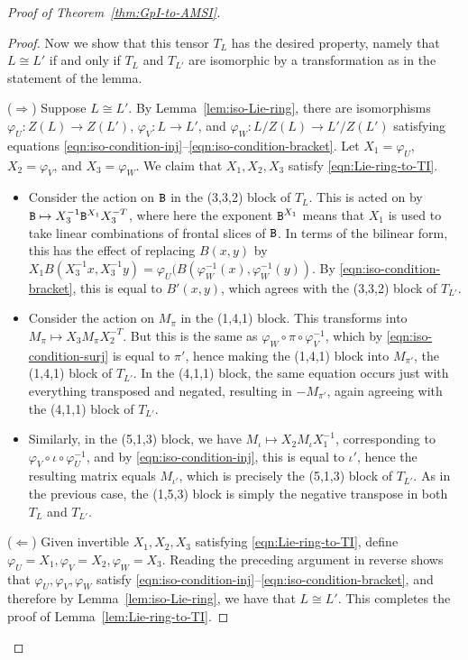 \begin{proof}[Proof of Theorem~\ref{thm:GpI-to-AMSI}]
\begin{proof}
Now we show that this tensor $T_L$ has the desired property, namely that $L \cong L'$ if and only if $T_L$ and $T_{L'}$ are isomorphic by a transformation as in the statement of the lemma.

($\Rightarrow$) Suppose $L \cong L'$. By Lemma~\ref{lem:iso-Lie-ring}, there are isomorphisms $\varphi_U \colon Z(L) \to Z(L')$, $\varphi_V \colon L \to L'$, and $\varphi_W \colon L/Z(L) \to L' / Z(L')$ satisfying equations \eqref{eqn:iso-condition-inj}--\eqref{eqn:iso-condition-bracket}. Let $X_1 = \varphi_U$, $X_2 = \varphi_V$, and $X_3 = \varphi_W$. We claim that $X_1, X_2, X_3$ satisfy \eqref{eqn:Lie-ring-to-TI}.
\begin{itemize}
\item Consider the action on $\mathtt{B}$ in the (3,3,2) block of $T_L$. This is acted on by $\mathtt{B} \mapsto X_3^{-1} \mathtt{B}^{X_1} X_3^{-T}$, where here the exponent $\mathtt{B}^{X_1}$ means that $X_1$ is used to take linear combinations of frontal slices of $\mathtt{B}$. In terms of the bilinear form, this has the effect of replacing $B(x,y)$ by $X_1 B(X_3^{-1} x, X_3^{-1} y) = \varphi_U(B(\varphi_W^{-1}(x), \varphi_W^{-1}(y))$. By \eqref{eqn:iso-condition-bracket}, this is equal to $B'(x,y)$, which agrees with the (3,3,2) block of $T_{L'}$.

\item Consider the action on $M_{\pi}$ in the (1,4,1) block.  This transforms into $M_\pi \mapsto X_3 M_\pi X_2^{-T}$. But this is the same as $\varphi_W \circ \pi \circ \varphi_V^{-1}$, which by \eqref{eqn:iso-condition-surj} is equal to $\pi'$, hence making the (1,4,1) block into $M_{\pi'}$, the (1,4,1) block of $T_{L'}$. In the (4,1,1) block, the same equation occurs just with everything transposed and negated, resulting in $-M_{\pi'}$, again agreeing with the (4,1,1) block of $T_{L'}$.

\item Similarly, in the (5,1,3) block, we have $M_{\iota} \mapsto X_2 M_{\iota} X_1^{-1}$, corresponding to $\varphi_V \circ \iota \circ \varphi_U^{-1}$, and by \eqref{eqn:iso-condition-inj}, this is equal to $\iota'$, hence the resulting matrix equals $M_{\iota'}$, which is precisely the (5,1,3) block of $T_{L'}$. As in the previous case, the (1,5,3) block is simply the negative transpose in both $T_L$ and $T_{L'}$.
\end{itemize}

($\Leftarrow$) Given invertible $X_1, X_2, X_3$ satisfying \eqref{eqn:Lie-ring-to-TI}, define $\varphi_U = X_1, \varphi_V = X_2, \varphi_W = X_3$. Reading the preceding argument in reverse shows that $\varphi_U, \varphi_V, \varphi_W$ satisfy \eqref{eqn:iso-condition-inj}--\eqref{eqn:iso-condition-bracket}, and therefore by Lemma~\ref{lem:iso-Lie-ring}, we have that $L \cong L'$. This completes the proof of Lemma~\ref{lem:Lie-ring-to-TI}.
\end{proof}


\end{proof}
